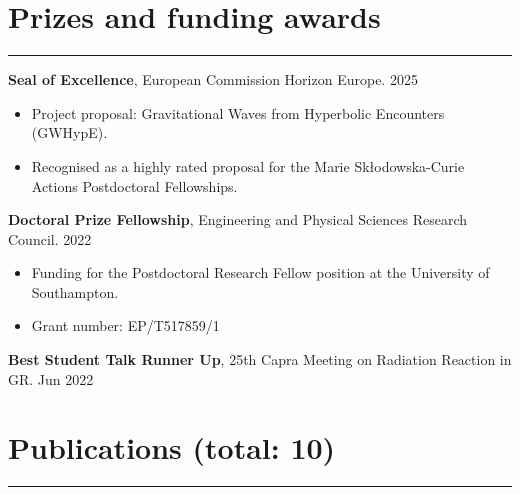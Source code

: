 \documentclass[10.5pt, oneside]{article}   	%
\begin{document}

{\color{Sectioncolour}
\section*{Prizes and funding awards}
\vspace{-3mm}
\noindent\rule{\linewidth}{0.6pt}}

\textbf{Seal of Excellence}, European Commission Horizon Europe. \hfill 2025 \\
\vspace{-5mm}
\begin{itemize}
\item Project proposal: Gravitational Waves from Hyperbolic Encounters (GWHypE).
\item Recognised as a highly rated proposal for the Marie Skłodowska-Curie Actions Postdoctoral Fellowships.
\end{itemize}
\textbf{Doctoral Prize Fellowship}, Engineering and Physical Sciences Research Council. \hfill 2022 \\
\vspace{-5mm}
\begin{itemize}
\item Funding for the Postdoctoral Research Fellow position at the University of Southampton.
\item Grant number: EP/T517859/1
\end{itemize}
\textbf{Best Student Talk Runner Up}, 25th Capra Meeting on Radiation Reaction in GR. \hfill Jun 2022 \\
 

\newpage

{\color{Sectioncolour}
\section*{Publications {\rm (total: 10)}}
\vspace{-3mm}
\noindent\rule{\linewidth}{0.6pt}}

\nocite{*}

\vspace{-5mm}
\printbibliography[notkeyword={prep},title={~}]
\end{document}
